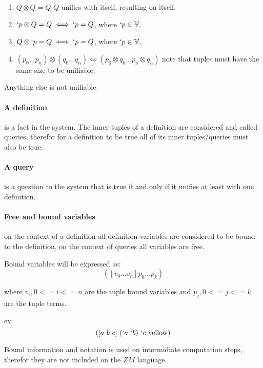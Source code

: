 \documentclass[11pt,a4paper]{report}
\newcommand{\zm}{ZM}
\newcommand{\var}[1]{`#1}
\newcommand{\unify}{\otimes}
\begin{document}
\begin{enumerate}
\item $Q \unify Q = Q$
    \subitem $Q$ unifies with itself, resulting on itself.

\item $\var{p} \unify Q = Q \iff \var{p} = Q$, where $\var{p} \in \mathbb{V}$.
\item $Q \unify \var{p} = Q \iff \var{p} = Q$, where $\var{p} \in \mathbb{V}$.

\item $(p_{0} \ldots p_{n}) \unify (q_{0} \ldots q_{n}) \iff (p_{0} \unify q_{0} \ldots p_{n} \unify q_{n})$
    \subitem note that tuples must have the same size to be unifiable.

\end{enumerate}

Anything else is not unifiable.


\paragraph{A definition} is a fact in the system. The inner tuples of a definition are considered and called queries, therefor
for a definition to be true all of its inner tuples/queries must also be true.

\paragraph{A query} is a question to the system that is true if and only if it unifies at least with
one definition.

\paragraph{Free and bound variables} on the context of a definition all definition variables are considered
to be bound to the definition, on the context of queries all variables are free.

Bound variables will be expressed as:
\[
    ([v_{0} \ldots v_{n}] p_{0} \ldots p_{k})
\]

where $v_{i}, 0 <= i <= n$ are the tuple bound variables and $p_{j}, 0 <= j <=k$ are the tuple terms.

ex:
\[
    ([a\ b\ c]\ (\var{a}\ \var{b})\ \var{c}\ \text{yellow})
\]

Bound information and notation is used on intermidiate computation steps, therefor they are not included on the $\zm$ language.
\end{document}
